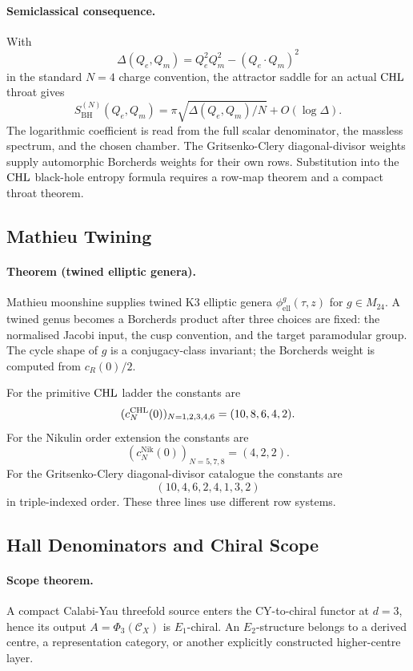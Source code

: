 \paragraph{Semiclassical consequence.}
With
\[
  \Delta(Q_e,Q_m)=Q_e^2Q_m^2-(Q_e\cdot Q_m)^2
\]
in the standard \(N=4\) charge convention, the attractor saddle for an
actual \(\mathrm{CHL}\) throat gives
\[
  S_{\mathrm{BH}}^{(N)}(Q_e,Q_m)
  =
  \pi\sqrt{\Delta(Q_e,Q_m)/N}
  +O(\log \Delta).
\]
The logarithmic coefficient is read from the full scalar denominator,
the massless spectrum, and the chosen chamber.  The Gritsenko-Clery
diagonal-divisor weights supply automorphic Borcherds weights for their
own rows.  Substitution into the \(\mathrm{CHL}\) black-hole entropy formula
requires a row-map theorem and a compact throat theorem.

\subsection*{Mathieu Twining}

\paragraph{Theorem (twined elliptic genera).}
Mathieu moonshine supplies twined K3 elliptic genera
\(\phi_{\mathrm{ell}}^{g}(\tau,z)\) for \(g\in M_{24}\).  A twined
genus becomes a Borcherds product after three choices are fixed:
the normalised Jacobi input, the cusp convention, and the target
paramodular group.  The cycle shape of \(g\) is a conjugacy-class
invariant; the Borcherds weight is computed from \(c_R(0)/2\).

For the primitive \(\mathrm{CHL}\) ladder the constants are
\[
  (c_N^{\mathrm{CHL}}(0))_{N=1,2,3,4,6}=(10,8,6,4,2).
\]
For the Nikulin order extension the constants are
\[
  (c_N^{\mathrm{Nik}}(0))_{N=5,7,8}=(4,2,2).
\]
For the Gritsenko-Clery diagonal-divisor catalogue the constants are
\[
  (10,4,6,2,4,1,3,2)
\]
in triple-indexed order.  These three lines use different row systems.

\subsection*{Hall Denominators and Chiral Scope}

\paragraph{Scope theorem.}
A compact Calabi-Yau threefold source enters the CY-to-chiral functor at
\(d=3\), hence its output \(A=\Phi_3(\mathcal C_X)\) is \(E_1\)-chiral.
An \(E_2\)-structure belongs to a derived centre, a representation
category, or another explicitly constructed higher-centre layer.

